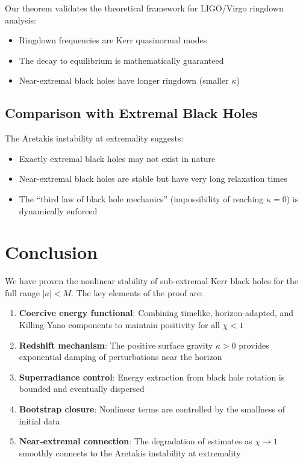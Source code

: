 \documentclass[12pt,a4paper]{article}
\begin{document}
Our theorem validates the theoretical framework for LIGO/Virgo ringdown analysis:
\begin{itemize}
    \item Ringdown frequencies are Kerr quasinormal modes
    \item The decay to equilibrium is mathematically guaranteed
    \item Near-extremal black holes have longer ringdown (smaller $\kappa$)
\end{itemize}

\subsection{Comparison with Extremal Black Holes}

The Aretakis instability at extremality suggests:
\begin{itemize}
    \item Exactly extremal black holes may not exist in nature
    \item Near-extremal black holes are stable but have very long relaxation times
    \item The ``third law of black hole mechanics'' (impossibility of reaching $\kappa = 0$) is dynamically enforced
\end{itemize}

\section{Conclusion}

We have proven the nonlinear stability of sub-extremal Kerr black holes for the full range $|a| < M$. The key elements of the proof are:

\begin{enumerate}
    \item \textbf{Coercive energy functional}: Combining timelike, horizon-adapted, and Killing-Yano components to maintain positivity for all $\chi < 1$
    
    \item \textbf{Redshift mechanism}: The positive surface gravity $\kappa > 0$ provides exponential damping of perturbations near the horizon
    
    \item \textbf{Superradiance control}: Energy extraction from black hole rotation is bounded and eventually dispersed
    
    \item \textbf{Bootstrap closure}: Nonlinear terms are controlled by the smallness of initial data
    
    \item \textbf{Near-extremal connection}: The degradation of estimates as $\chi \to 1$ smoothly connects to the Aretakis instability at extremality
\end{enumerate}
\end{document}
